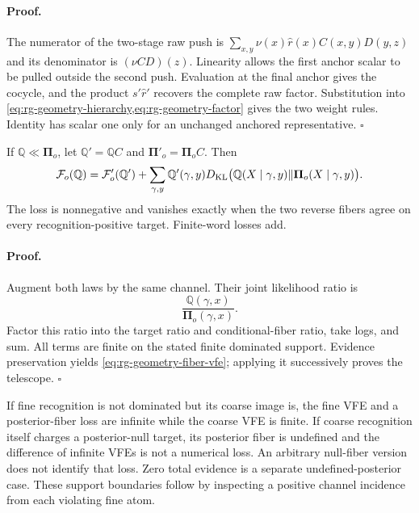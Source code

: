 \paragraph{Proof.}
The numerator of the two-stage raw push is
$\sum_{x,y}\nu(x)\widehat r(x)C(x,y)D(y,z)$ and its denominator is
$(\nu CD)(z)$. Linearity allows the first anchor scalar to be pulled outside
the second push. Evaluation at the final anchor gives the cocycle, and the
product $s'\widehat r'$ recovers the complete raw factor. Substitution into
\cref{eq:rg-geometry-hierarchy,eq:rg-geometry-factor} gives the two weight
rules. Identity has scalar one only for an unchanged anchored representative.
$\square$

If $\mathbb Q\ll\boldsymbol\Pi_o$, let $\mathbb Q'=\mathbb Q C$ and
$\boldsymbol\Pi'_o=\boldsymbol\Pi_o C$. Then
\begin{equation}
 \mathcal F_o(\mathbb Q)=\mathcal F'_o(\mathbb Q')+
 \sum_{\gamma,y}\mathbb Q'(\gamma,y)
 D_{\mathrm{KL}}\bigl(\mathbb Q(X\mid\gamma,y)\Vert
                 \boldsymbol\Pi_o(X\mid\gamma,y)\bigr).
 \label{eq:rg-geometry-fiber-vfe}
\end{equation}
The loss is nonnegative and vanishes exactly when the two reverse fibers
agree on every recognition-positive target. Finite-word losses add.

\paragraph{Proof.}
Augment both laws by the same channel. Their joint likelihood ratio is
\begin{equation}
 \frac{\mathbb Q(\gamma,x)}{\boldsymbol\Pi_o(\gamma,x)}.
\end{equation}
Factor this ratio into the target ratio and conditional-fiber ratio, take logs,
and sum. All terms are finite on the stated finite dominated support.
Evidence preservation yields \cref{eq:rg-geometry-fiber-vfe}; applying it
successively proves the telescope.
$\square$

If fine recognition is not dominated but its coarse image is, the fine
VFE and a posterior-fiber loss are infinite while the coarse VFE is finite.
If coarse recognition itself charges a posterior-null target, its posterior
fiber is undefined and the difference of infinite VFEs is not a numerical
loss. An arbitrary null-fiber version does not identify that loss. Zero
total evidence is a separate undefined-posterior case. These support
boundaries follow by inspecting a positive channel incidence from each
violating fine atom. 

